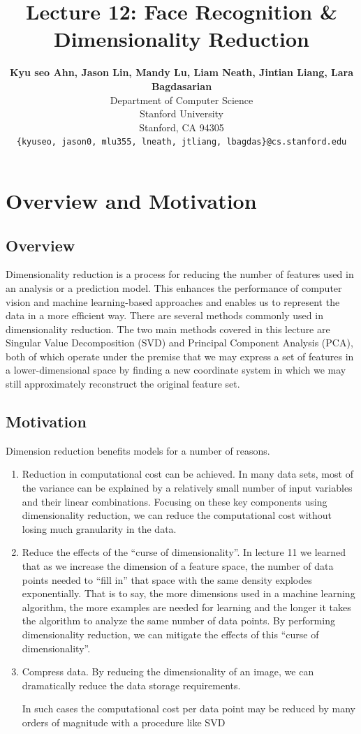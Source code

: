 \documentclass{article}
\title{Lecture 12: Face Recognition \& Dimensionality Reduction}
\author{
  \textbf{Kyu seo Ahn, Jason Lin, Mandy Lu, Liam Neath, Jintian Liang, Lara Bagdasarian} \\
  Department of Computer Science\\
  Stanford University\\
  Stanford, CA 94305 \\
  \texttt{\{kyuseo, jason0, mlu355, lneath, jtliang, lbagdas\}@cs.stanford.edu} \\
}
\begin{document}
\maketitle

\section{Overview and Motivation}
\subsection{Overview}
Dimensionality reduction is a process for reducing the number of features used in an analysis or a prediction model. This enhances the performance of computer vision and machine learning-based approaches and enables us to represent the data in a more efficient way. There are several methods commonly used in dimensionality reduction. The two main methods covered in this lecture are Singular Value Decomposition (SVD) and Principal Component Analysis (PCA), both of which operate under the premise that we may express a set of features in a lower-dimensional space by finding a new coordinate system in which we may still approximately reconstruct the original feature set.

\subsection{Motivation}
Dimension reduction benefits models for a number of reasons.\\
\begin{enumerate}
\item Reduction in computational cost can be achieved. In many data sets, most of the variance can be explained by a relatively small number of input variables and their linear combinations. Focusing on these key components using dimensionality reduction, we can reduce the computational cost without losing much granularity in the data.

\item Reduce the effects of the “curse of dimensionality”. In lecture 11 we learned that as we increase the dimension of a feature space, the number of data points needed to “fill in” that space with the same density explodes exponentially. That is to say, the more dimensions used in a machine learning algorithm, the more examples are needed for learning and the longer it takes the algorithm to analyze the same number of data points. By performing dimensionality reduction, we can mitigate the effects of this “curse of dimensionality”.

\item Compress data. By reducing the dimensionality of an image, we can dramatically reduce the data storage requirements. 

In such cases the computational cost per data point may be reduced by many orders of magnitude with a procedure like SVD 
\end{enumerate}
\end{document}
